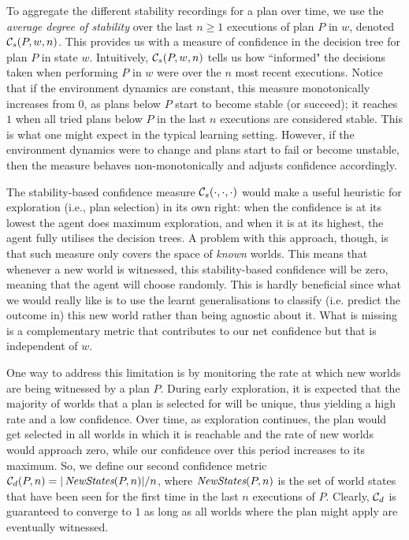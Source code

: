 To aggregate the different stability recordings for a plan over time, we use the \emph{average degree of stability} over the last $n \geq 1$ executions of plan $P$ in $w$, denoted ${\mathcal{C}}_s(P,w,n)$. 
This provides us with a measure of confidence in the decision tree for plan $P$ in state $w$. Intuitively, ${\mathcal{C}}_s(P,w,n)$ tells us how ``informed" the decisions taken when performing $P$ in $w$ were over the $n$ most recent executions.
Notice that if the environment dynamics are constant, this measure monotonically increases from $0$, as plans below $P$ start to become stable (or succeed); it reaches $1$ when all tried plans below $P$ in the last $n$ executions are considered stable. This is what one might expect in the typical learning setting. However, if the environment dynamics were to change and plans start to fail or become unstable, then the measure behaves non-monotonically and adjusts confidence accordingly.

The stability-based confidence measure ${\mathcal{C}}_s(\cdot,\cdot,\cdot)$ would make a useful heuristic for exploration (i.e., plan selection) in its own right: when the confidence is at its lowest the agent does maximum exploration, and when it is at its highest, the agent fully utilises the decision trees. 
A problem with this approach, though, is that such measure only covers the space of \emph{known} worlds. This means that whenever a new world is witnessed, this stability-based confidence will be zero, meaning that the agent will choose randomly. This is hardly beneficial since what we would really like is to use the learnt generalisations to classify (i.e. predict the outcome in) this new world rather than being agnostic about it. 
What is missing is a complementary metric that contributes to our net confidence but that is independent of $w$.


\newcommand{\neww}{\mathname{NewStates}}
One way to address this limitation is by monitoring the rate at which new worlds are being witnessed by a  plan $P$. During early exploration, it is expected that the majority of worlds that a plan is selected for will be unique, thus yielding a high rate and a low confidence. Over time, as exploration continues, the plan would get selected in all worlds in which it is reachable and the rate of new worlds would approach zero, while our confidence over this period increases to its maximum.  
So, we define our second confidence metric $\C_d(P,n) = |\neww(P,n)|/n$, where $\neww(P,n)$ is the set of world states that have been seen for the first time in the last $n$ executions of $P$.
Clearly, ${\mathcal{C}}_d$ is guaranteed to converge to $1$ as long as all worlds where the plan might apply are eventually witnessed.

